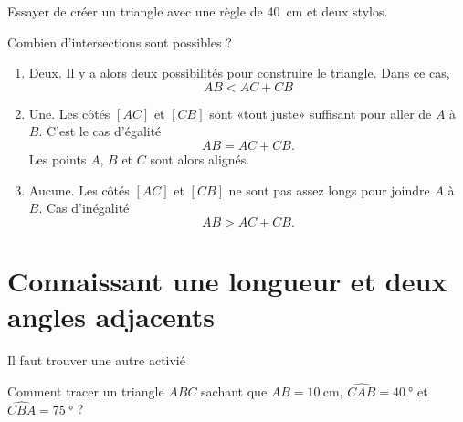\begin{example}
    Essayer de créer un triangle avec une règle de \SI{40}{\centi\meter} et deux stylos.
\end{example}

Combien d'intersections sont possibles ?
\begin{enumerate}
    \item
        Deux. Il y a alors deux possibilités pour construire le triangle. Dans ce cas,
        \begin{equation}
            AB<AC+CB
        \end{equation}
    \item
        Une. Les côtés \( [AC]\) et \( [CB]\) sont «tout juste» suffisant pour aller de \( A\) à \( B\). C'est le cas d'égalité
        \begin{equation}
            AB=AC+CB.
        \end{equation}
        Les points \( A\), \( B\) et \( C\) sont alors alignés.
    \item 
        Aucune. Les côtés \( [AC]\) et \( [CB]\) ne sont pas assez longs pour joindre \( A\) à \( B\). Cas d'inégalité
        \begin{equation}
            AB>AC+CB.
        \end{equation}
\end{enumerate}

\section{Connaissant une longueur et deux angles adjacents}

\large{Il faut trouver une autre activié}


Comment tracer un triangle \( ABC\) sachant que \( AB=\SI{10}{\centi\meter}\), \( \widehat{CAB}=\SI{40}{\degree}\) et \( \widehat{CBA}=\SI{75}{\degree}\) ?



